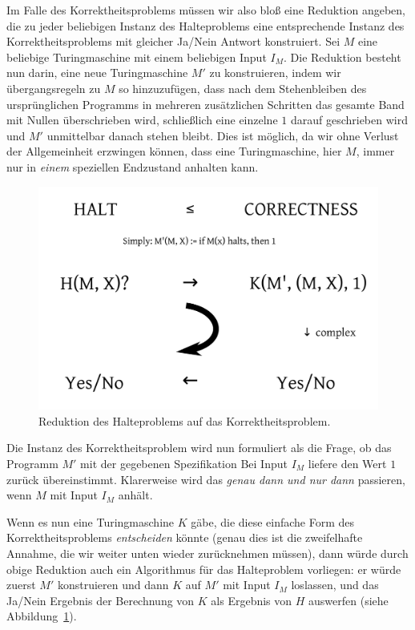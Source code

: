 Im Falle des Korrektheitsproblems müssen wir also bloß eine Reduktion angeben, die zu jeder beliebigen Instanz des Halteproblems eine entsprechende Instanz des Korrektheits\-problems mit gleicher Ja/Nein Antwort konstruiert. Sei $M$ eine beliebige Turingmaschine mit einem beliebigen Input $I_M$. Die Reduktion besteht nun darin, eine neue Turingmaschine $M'$ zu konstruieren, indem wir übergangsregeln zu $M$ so hinzuzufügen, dass nach dem Stehenbleiben des ursprünglichen Programms in mehreren zusätzlichen Schritten das gesamte Band mit Nullen überschrieben wird, schließlich eine einzelne $1$ darauf geschrieben wird und $M'$ unmittelbar danach stehen bleibt. Dies ist möglich, da wir ohne Verlust der Allgemeinheit erzwingen können, dass eine Turingmaschine, hier $M$, immer nur in \emph{einem} speziellen Endzustand anhalten kann.

\begin{figure}[h]
\centering
\includegraphics[width=12cm]{img/correctnessproblem}
\caption{Reduktion des Halteproblems auf das Korrektheitsproblem.}
\label{fig:correctnessproblem}
\end{figure}

Die Instanz des Korrektheitsproblem wird nun formuliert als die Frage, ob das Programm $M'$ mit der gegebenen Spezifikation \glqq{}Bei Input $I_M$ liefere den Wert $1$ zurück\grqq{} übereinstimmt. Klarerweise wird das \emph{genau dann und nur dann} passieren, wenn $M$ mit Input $I_M$ anhält.

Wenn es nun eine Turingmaschine $K$ gäbe, die diese einfache Form des Korrektheitspro\-blems \emph{entscheiden} könnte (genau dies ist die zweifelhafte Annahme, die wir weiter unten wieder zurücknehmen müssen), dann würde durch obige Reduktion auch ein Algorithmus für das Halteproblem vorliegen: er würde zuerst $M'$ konstruieren und dann $K$ auf $M'$ mit Input $I_M$ loslassen, und das Ja/Nein Ergebnis der Berechnung von $K$ als Ergebnis von $H$ auswerfen (siehe Abbildung~\ref{fig:correctnessproblem}).

